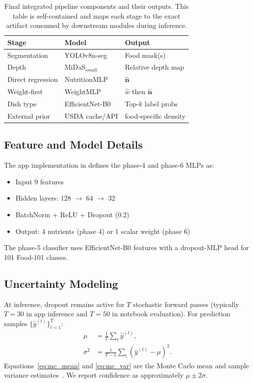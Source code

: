 \documentclass[10pt,twocolumn,letterpaper]{article}
\begin{document}
\begin{table}[t]
\centering
\caption{Final integrated pipeline components and their outputs. This table is self-contained and maps each stage to the exact artifact consumed by downstream modules during inference.}
\label{tab:components}
\begin{tabular}{lll}
\toprule
Stage & Model & Output \\
\midrule
Segmentation & YOLOv8n-seg & Food mask(s) \\
Depth & MiDaS$_{small}$ & Relative depth map \\
Direct regression & NutritionMLP & $\hat{\mathbf{n}}$ \\
Weight-first & WeightMLP & $\hat{w}$ then $\hat{\mathbf{n}}$ \\
Dish type & EfficientNet-B0 & Top-$k$ label probs \\
External prior & USDA cache/API & food-specific density \\
\bottomrule
\end{tabular}
\end{table}

\subsection{Feature and Model Details}
The app implementation in  defines the phase-4 and phase-6 MLPs as:
\begin{itemize}
\item Input 9 features
\item Hidden layers: 128 $\rightarrow$ 64 $\rightarrow$ 32
\item BatchNorm + ReLU + Dropout (0.2)
\item Output: 4 nutrients (phase 4) or 1 scalar weight (phase 6)
\end{itemize}

The phase-5 classifier uses EfficientNet-B0 features with a dropout-MLP head for 101 Food-101 classes.

\subsection{Uncertainty Modeling}
At inference, dropout remains active for $T$ stochastic forward passes (typically $T=30$ in app inference and $T=50$ in notebook evaluation). For prediction samples $\{\hat{y}^{(t)}\}_{t=1}^T$:
\begin{align}
\mu &= \frac{1}{T}\sum_t \hat{y}^{(t)}, \label{eq:mc_mean}\\
\sigma^2 &= \frac{1}{T-1}\sum_t\left(\hat{y}^{(t)}-\mu\right)^2. \label{eq:mc_var}
\end{align}
Equations~\eqref{eq:mc_mean} and \eqref{eq:mc_var} are the Monte Carlo mean and sample variance estimates~\cite{gal2016dropout}. We report confidence as approximately $\mu \pm 2\sigma$.
\end{document}
